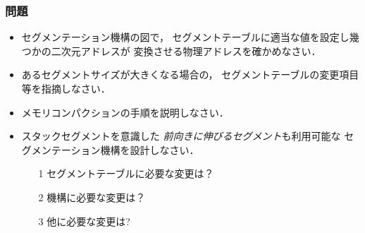 \documentclass[unicode]{beamer}                   %
\begin{document}
\begin{frame}
  \frametitle{問題}

  \begin{itemize}
    \item セグメンテーション機構の図で，
      セグメントテーブルに適当な値を設定し幾つかの二次元アドレスが
      変換させる物理アドレスを確かめなさい．
    \item あるセグメントサイズが大きくなる場合の，
      セグメントテーブルの変更項目等を指摘しなさい．
    \item メモリコンパクションの手順を説明しなさい．
    \item スタックセグメントを意識した
    \emph{前向きに伸びるセグメント}も利用可能な
    セグメンテーション機構を設計しなさい．
    \begin{enumerate}
    \item[1] セグメントテーブルに必要な変更は？
    \item[2] 機構に必要な変更は？
    \item[3] 他に必要な変更は?
    \end{enumerate}
  \end{itemize}
\end{frame}
\end{document}
